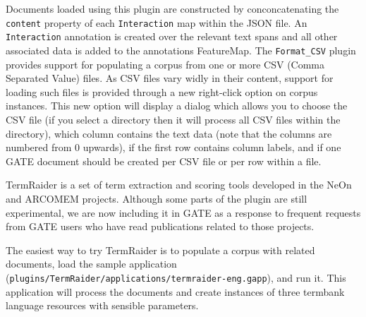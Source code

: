 Documents loaded using this plugin are constructed by conconcatenating the
\verb!content! property of each \verb!Interaction! map within the JSON file.
An \verb!Interaction! annotation is created over the relevant text spans and
all other associated data is added to the annotations FeatureMap.
%
%
The \verb!Format_CSV! plugin provides support for populating a corpus from one
or more CSV (Comma Separated Value) files. As CSV files vary widly in their
content, support for loading such files is provided through a new right-click
option on corpus instances. This new option will display a dialog which allows
you to choose the CSV file (if you select a directory then it will process all
CSV files within the directory), which column contains the text data (note that
the columns are numbered from 0 upwards), if the first row contains column labels,
and if one GATE document should be created per CSV file or per row within a file.

TermRaider is a set of term extraction and scoring tools developed in the NeOn
and ARCOMEM projects.  Although some parts of the plugin are still experimental,
we are now including it in GATE as a response to frequent requests from GATE
users who have read publications related to those projects.

The easiest way to try TermRaider is to populate a corpus with related
documents, load the sample application
(\texttt{plugins/TermRaider/applications/termraider-eng.gapp}), and run it.
This application will process the documents and create instances of three
termbank language resources with sensible parameters.

